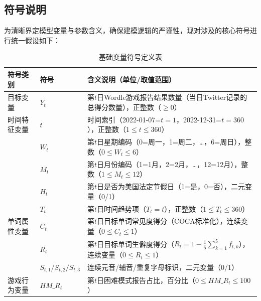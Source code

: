 \documentclass[12pt]{article}  %
\begin{document}
\subsection{符号说明}
为清晰界定模型变量与参数含义，确保建模逻辑的严谨性，现对涉及的核心符号进行统一假设如下：
\begin{table}[htbp]
  \centering
  \renewcommand{\arraystretch}{1.2}
  \caption{基础变量符号定义表}
  \label{tab:basic_var_def}
  \begin{tabular}{@{}p{}p{}p{}@{}}
    \toprule
    符号类别 & 符号 & 含义说明（单位/取值范围） \\
    \midrule
    目标变量 & $Y_t$ & 第$t$日Wordle游戏报告结果数量（当日Twitter记录的总得分数量），正整数（$\geq0$） \\
    \midrule
    时间特征变量 & $t$ & 时间索引（2022-01-07=$t=1$，2022-12-31=$t=360$），正整数（$1\leq t\leq360$） \\
    & $W_t$ & 第$t$日星期编码（0=周一，1=周二，…，6=周日），整数（$0\leq W_t\leq6$） \\
    & $M_t$ & 第$t$日月份编码（1=1月，2=2月，…，12=12月），整数（$1\leq M_t\leq12$） \\
    & $H_t$ & 第$t$日是否为美国法定节假日（1=是，0=否），二元变量（0/1） \\
    & $T_t$ & 第$t$日时间趋势项（$T_t=t$），正整数（$1\leq T_t\leq360$） \\
    \midrule
    单词属性变量 & $C_t$ & 第$t$日目标单词常见度得分（COCA标准化），连续变量（$0\leq C_t\leq1$） \\
    & $R_t$ & 第$t$日目标单词生僻度得分（$R_t=1-\frac{1}{5}\sum_{k=1}^5 f_{t,k}$），连续变量（$0\leq R_t\leq1$） \\
    & $S_{t,1}/S_{t,2}/S_{t,3}$ & 连续元音/辅音/重复字母标识，二元变量（0/1） \\
    \midrule
    游戏行为变量 & $HM\_R_t$ & 第$t$日困难模式报告占比，百分比（$0\leq HM\_R_t\leq100$） \\
    \bottomrule
  \end{tabular}
\end{table}
\end{document}
